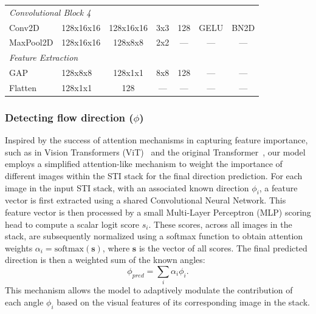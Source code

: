 \documentclass[12pt]{elsarticle}
\begin{document}
\begin{table}[!htbp]
{\begin{tabular}{llccccc}
        \midrule
        \multicolumn{6}{l}{\textit{Convolutional Block 4}} \\
        Conv2D                    & 128x16x16           & 128x16x16           & 3x3     & 128           & GELU   & BN2D    \\
        MaxPool2D                 & 128x16x16           & 128x8x8             & 2x2     & ---           & ---  & ---       \\
        \midrule
        \multicolumn{6}{l}{\textit{Feature Extraction}} \\
        GAP  & 128x8x8             & 128x1x1             & 8x8     & 128           & ---   & ---     \\
        Flatten                   & 128x1x1             & 128                 & ---     & ---           & ---  & ---       \\
        \bottomrule
    \end{tabular}
    } %
\end{table}

\subsubsection{Detecting flow direction ($\phi$)}

Inspired by the success of attention mechanisms in capturing feature importance, 
such as in Vision Transformers (ViT)~\cite{dosovitskiy2020ViT} and the original 
Transformer~\cite{vaswani2017attention}, our model employs a simplified 
attention-like mechanism to weight the importance of different images within the 
STI stack for the final direction prediction. 
For each image in the input STI stack, with an associated known direction $\phi_i$, 
a feature vector is first extracted using a shared Convolutional Neural Network. 
This feature vector is then processed by a small Multi-Layer Perceptron (MLP) 
scoring head to compute a scalar logit score $s_i$. These scores, across all 
images in the stack, are subsequently normalized using a softmax function to obtain 
attention weights $\alpha_i = \mathrm{softmax}(\mathbf{s})$, where $\mathbf{s}$ 
is the vector of all scores. The final predicted direction is then a weighted sum 
of the known angles: 
\begin{equation}
    \phi_{pred} = \sum_i \alpha_i \phi_i.
\end{equation}
This mechanism allows the model to 
adaptively modulate the contribution of each angle $\phi_i$ based on the visual 
features of its corresponding image in the stack.
\end{document}
